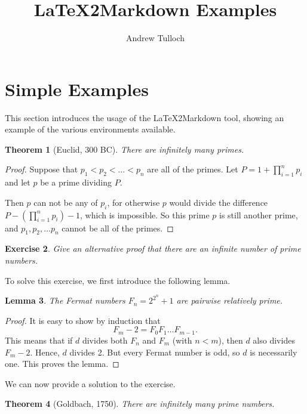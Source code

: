 \documentclass[12pt]{amsart}
\title{LaTeX2Markdown Examples}
\author{Andrew Tulloch}
\theoremstyle{plain}%
\newtheorem{thm}{Theorem}[section]
\newtheorem{lem}[thm]{Lemma}
\newtheorem{exer}[thm]{Exercise}
\begin{document}
\underline{       }
\underline{      }
\maketitle

\section{Simple Examples}

This section introduces the usage of the LaTeX2Markdown tool, showing an example of the various environments available.  

\begin{thm}[Euclid, 300 BC]
    There are infinitely many primes.
\end{thm}

\begin{proof}
    Suppose that $p_1 < p_2 < \dots < p_n$ are all of the primes. Let $P = 1 + \prod_{i=1}^n p_i$ and let $p$ be a prime dividing $P$.
    
    Then $p$ can not be any of $p_i$, for otherwise $p$ would divide the difference $P - \left(\prod_{i=1}^n p_i \right) - 1$, which is impossible. So this prime $p$ is still another prime, and $p_1, p_2, \dots p_n$ cannot be all of the primes.
\end{proof}

\begin{exer}
    Give an alternative proof that there are an infinite number of prime numbers.
\end{exer}

To solve this exercise, we first introduce the following lemma.
\begin{lem}
    The Fermat numbers $F_n = 2^{2^{n}} + 1$ are pairwise relatively prime.
\end{lem}

\begin{proof}
    It is easy to show by induction that 
    \[ F_m - 2 = F_0 F_1 \dots F_{m-1}. \]
    This means that if $d$ divides both $F_n$ and $F_m$ (with $n < m$), then $d$ also divides $F_m - 2$.  Hence, $d$ divides 2.  But every Fermat number is odd, so $d$ is necessarily one.  This proves the lemma.
\end{proof}

We can now provide a solution to the exercise.

\begin{thm}[Goldbach, 1750]
    There are infinitely many prime numbers.
\end{thm}
\end{document}

